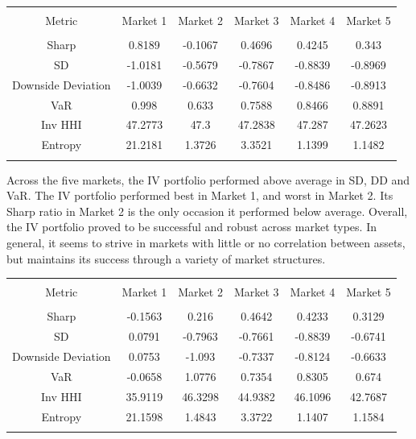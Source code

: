 \documentclass[11pt,preprint, authoryear]{elsarticle}
\let\origtable\table
\let\endorigtable\endtable
\renewenvironment{table}[1][2] {
    \expandafter\origtable\expandafter[H]
} {
    \endorigtable
}
\numberwithin{equation}{section}
\numberwithin{figure}{section}
\numberwithin{table}{section}
\begin{document}
\begin{table}[!htbp] \centering 
  \caption{Inverse Volatility} 
  \label{iv} 
\begin{tabular}{@{\extracolsep{5pt}} cccccc} 
\\[-1.8ex]\hline 
\hline \\[-1.8ex] 
Metric & Market 1 & Market 2 & Market 3 & Market 4 & Market 5 \\ 
\hline \\[-1.8ex] 
Sharp & 0.8189 & -0.1067 & 0.4696 & 0.4245 & 0.343 \\ 
SD & -1.0181 & -0.5679 & -0.7867 & -0.8839 & -0.8969 \\ 
Downside Deviation & -1.0039 & -0.6632 & -0.7604 & -0.8486 & -0.8913 \\ 
VaR & 0.998 & 0.633 & 0.7588 & 0.8466 & 0.8891 \\ 
Inv HHI & 47.2773 & 47.3 & 47.2838 & 47.287 & 47.2623 \\ 
Entropy & 21.2181 & 1.3726 & 3.3521 & 1.1399 & 1.1482 \\ 
\hline \\[-1.8ex] 
\end{tabular} 
\end{table}

Across the five markets, the IV portfolio performed above average in SD,
DD and VaR. The IV portfolio performed best in Market 1, and worst in
Market 2. Its Sharp ratio in Market 2 is the only occasion it performed
below average. Overall, the IV portfolio proved to be successful and
robust across market types. In general, it seems to strive in markets
with little or no correlation between assets, but maintains its success
through a variety of market structures.

\begin{table}[!htbp] \centering 
  \caption{Equal Risk Contribution} 
  \label{erc} 
\begin{tabular}{@{\extracolsep{5pt}} cccccc} 
\\[-1.8ex]\hline 
\hline \\[-1.8ex] 
Metric & Market 1 & Market 2 & Market 3 & Market 4 & Market 5 \\ 
\hline \\[-1.8ex] 
Sharp & -0.1563 & 0.216 & 0.4642 & 0.4233 & 0.3129 \\ 
SD & 0.0791 & -0.7963 & -0.7661 & -0.8839 & -0.6741 \\ 
Downside Deviation & 0.0753 & -1.093 & -0.7337 & -0.8124 & -0.6633 \\ 
VaR & -0.0658 & 1.0776 & 0.7354 & 0.8305 & 0.674 \\ 
Inv HHI & 35.9119 & 46.3298 & 44.9382 & 46.1096 & 42.7687 \\ 
Entropy & 21.1598 & 1.4843 & 3.3722 & 1.1407 & 1.1584 \\ 
\hline \\[-1.8ex] 
\end{tabular} 
\end{table}
\end{document}
